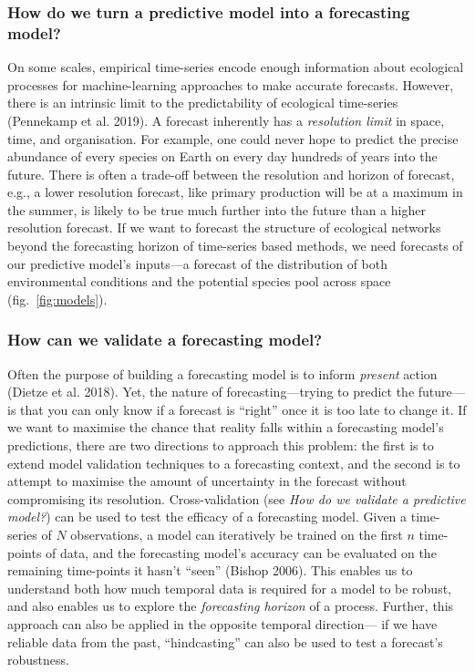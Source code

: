 \documentclass[10pt,oneside]{article}
\begin{document}
\hypertarget{how-do-we-turn-a-predictive-model-into-a-forecasting-model}{%
\subsubsection{How do we turn a predictive model into a forecasting
model?}\label{how-do-we-turn-a-predictive-model-into-a-forecasting-model}}

On some scales, empirical time-series encode enough information about
ecological processes for machine-learning approaches to make accurate
forecasts. However, there is an intrinsic limit to the predictability of
ecological time-series (Pennekamp et al. 2019). A forecast inherently
has a \emph{resolution limit} in space, time, and organisation. For
example, one could never hope to predict the precise abundance of every
species on Earth on every day hundreds of years into the future. There
is often a trade-off between the resolution and horizon of forecast,
e.g., a lower resolution forecast, like primary production will be at a
maximum in the summer, is likely to be true much further into the future
than a higher resolution forecast. If we want to forecast the structure
of ecological networks beyond the forecasting horizon of time-series
based methods, we need forecasts of our predictive model's inputs---a
forecast of the distribution of both environmental conditions and the
potential species pool across space (fig.~\ref{fig:models}).

\hypertarget{how-can-we-validate-a-forecasting-model}{%
\subsubsection{How can we validate a forecasting
model?}\label{how-can-we-validate-a-forecasting-model}}

Often the purpose of building a forecasting model is to inform
\emph{present} action (Dietze et al. 2018). Yet, the nature of
forecasting---trying to predict the future---is that you can only know
if a forecast is ``right'' once it is too late to change it. If we want
to maximise the chance that reality falls within a forecasting model's
predictions, there are two directions to approach this problem: the
first is to extend model validation techniques to a forecasting context,
and the second is to attempt to maximise the amount of uncertainty in
the forecast without compromising its resolution. Cross-validation (see
\emph{How do we validate a predictive model?}) can be used to test the
efficacy of a forecasting model. Given a time-series of \(N\)
observations, a model can iteratively be trained on the first \(n\)
time-points of data, and the forecasting model's accuracy can be
evaluated on the remaining time-points it hasn't ``seen'' (Bishop 2006).
This enables us to understand both how much temporal data is required
for a model to be robust, and also enables us to explore the
\emph{forecasting horizon} of a process. Further, this approach can also
be applied in the opposite temporal direction--- if we have reliable
data from the past, ``hindcasting'' can also be used to test a
forecast's robustness.
\end{document}
